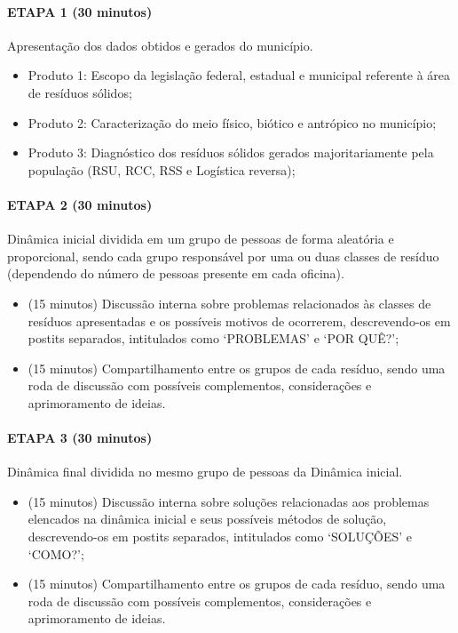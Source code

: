	
	\paragraph{ETAPA 1 (30 minutos)} Apresentação dos dados obtidos e gerados do município.
	\begin{itemize}
		\item Produto 1: Escopo da legislação federal, estadual e municipal referente à área de resíduos sólidos;
		\item Produto 2: Caracterização do meio físico, biótico e antrópico no município;
		\item Produto 3: Diagnóstico dos resíduos sólidos gerados majoritariamente pela população (RSU, RCC, RSS e Logística reversa);
	\end{itemize}
	 
	\paragraph{ETAPA 2 (30 minutos)} Dinâmica inicial dividida em um grupo de pessoas de forma aleatória e proporcional, sendo cada grupo responsável por uma ou duas classes de resíduo (dependendo do número de pessoas presente em cada oficina).
	\begin{itemize}
		\item (15 minutos) Discussão interna sobre problemas relacionados às classes de resíduos apresentadas e os possíveis motivos de ocorrerem, descrevendo-os em postits separados, intitulados como ‘PROBLEMAS’ e ‘POR QUÊ?’;
		\item (15 minutos) Compartilhamento entre os grupos de cada resíduo, sendo uma roda de discussão com possíveis complementos, considerações e aprimoramento de ideias.
	\end{itemize}
	
	\paragraph{ETAPA 3 (30 minutos)} Dinâmica final dividida no mesmo grupo de pessoas da Dinâmica inicial.
	
	\begin{itemize}
		\item (15 minutos) Discussão interna sobre soluções relacionadas aos problemas elencados na dinâmica inicial e seus possíveis métodos de solução, descrevendo-os em postits separados, intitulados como ‘SOLUÇÕES’ e ‘COMO?’;
		\item (15 minutos) Compartilhamento entre os grupos de cada resíduo, sendo uma roda de discussão com possíveis complementos, considerações e aprimoramento de ideias.
	\end{itemize}
	
